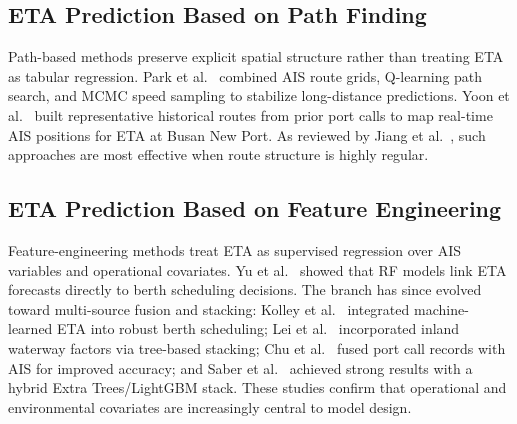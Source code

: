 \documentclass[sigconf,anonymous]{acmart}%
\begin{document}
\subsection{ETA Prediction Based on Path Finding}
Path-based methods preserve explicit spatial structure rather than treating ETA as tabular regression. Park et al.~\cite{parkVesselEstimatedTime2021} combined AIS route grids, Q-learning path search, and MCMC speed sampling to stabilize long-distance predictions. Yoon et al.~\cite{yoonEnhancingContainerVessel2023} built representative historical routes from prior port calls to map real-time AIS positions for ETA at Busan New Port. As reviewed by Jiang et al.~\cite{jiangPredictionVesselArrival2025}, such approaches are most effective when route structure is highly regular.

\subsection{ETA Prediction Based on Feature Engineering}
Feature-engineering methods treat ETA as supervised regression over AIS variables and operational covariates. Yu et al.~\cite{yuShipArrivalPrediction2018} showed that RF models link ETA forecasts directly to berth scheduling decisions. The branch has since evolved toward multi-source fusion and stacking: Kolley et al.~\cite{kolleyRobustBerthScheduling2022} integrated machine-learned ETA into robust berth scheduling; Lei et al.~\cite{leiPredictingVesselArrival2024} incorporated inland waterway factors via tree-based stacking; Chu et al.~\cite{chuVesselArrivalTime2025} fused port call records with AIS for improved accuracy; and Saber et al.~\cite{saberHighaccuracyPredictionVessels2025} achieved strong results with a hybrid Extra Trees/LightGBM stack. These studies confirm that operational and environmental covariates are increasingly central to model design.

\end{document}
